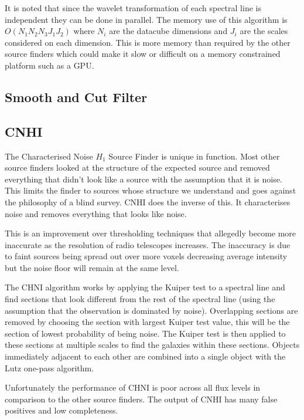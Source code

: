 \documentclass[prodmode,acmtecs]{acmsmall} \usepackage[ruled]{algorithm2e}
\begin{document}
    It is noted that since the wavelet transformation of each spectral line is independent they
    can be done in parallel. The memory use of this algorithm is $O(N_1 N_2 N_3 J_1 J_2)$ where $N_i$
    are the datacube dimensions and $J_i$ are the scales considered on each dimension. This is more
    memory than required by the other source finders which could make it slow or difficult on a memory
    constrained platform such as a GPU. 
    
    \cite{floer20122d}

    \subsection{Smooth and Cut Filter}
\cite{serra2012atlas3d}
 
     \subsection{CNHI}
     The Characterised Noise $H_1$ Source Finder is unique in function. Most other 
    source finders looked at the structure of the expected source and
     removed everything that didn't look like a source with the assumption that it is noise.
     This limits the finder to sources whose structure we understand and goes against the 
     philosophy of a blind survey. 
     CNHI does the inverse of this. It characterises noise and removes everything that
     looks like noise. 
     
     This is an improvement over thresholding techniques that allegedly become more inaccurate
     as the resolution of radio telescopes increases. The inaccuracy is due to faint sources
     being spread out over more voxels decreasing average intensity but the noise floor will
     remain at the same level. 
     
     The CHNI algorithm works by applying the Kuiper test to a spectral line and find sections 
     that look different from the rest of the spectral line (using the assumption that the
     observation is dominated by noise). Overlapping sections are removed by choosing the 
     section with largest Kuiper test value, this will be the section of lowest probability
     of being noise. The Kuiper test is then applied to these sections at multiple scales to
     find the galaxies within these sections. Objects immediately adjacent to each other
     are combined into a single object with the Lutz one-pass algorithm.
     
     Unfortunately the performance of CHNI is poor across all flux levels in comparison to the
     other source finders. The output of CNHI has many false positives and low completeness. 
     
\end{document}
